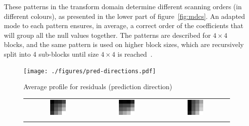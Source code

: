 \documentclass[11pt,a4paper,openright,twoside]{book}
\def\usepdfs{1} %
\numberwithin{equation}{section} %
\numberwithin{figure}{section} %
\numberwithin{table}{section} %
\begin{document}
These patterns in the transform domain determine different scanning orders (in
different colours), as presented in the lower part of figure~\ref{fig:mdcs}.
An adapted mode to each pattern ensures, in average, a correct order of the
coefficients that will group all the null values together.
The patterns are described for $4\times4$ blocks, and the same pattern is used
on higher block sizes, which are recursively split into 4 sub-blocks until
size $4\times4$ is reached~\cite{sole-12-transform-coefficient-coding}.

\begin{figure}[tb]
	\centering
	\begin{minipage}{0.48\textwidth}

		\ifthenelse{\usepdfs = 0}
		{}
		{\texttt{[image: ./figures/pred-directions.pdf]}}
	\end{minipage}
	\begin{minipage}{0.48\textwidth}
		\centering
		\small
		Average profile for residuals (prediction direction)
		\begin{tabular}[H]{ccc}
			\includegraphics[width=0.25\textwidth]{figures/resids-scan-diag.png}
			&
			\includegraphics[width=0.25\textwidth]{figures/resids-scan-horz.png}
			&
			\includegraphics[width=0.25\textwidth]{figures/resids-scan-vert.png}
			\\
			\color{red}{diagonal} & \color{greenish}{vertical} & \color{blue}{horizontal} \\

\end{tabular}
\end{minipage}
\end{figure}
\end{document}
